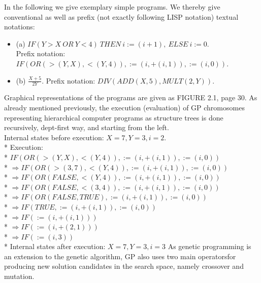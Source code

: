 \documentclass[12pt]{book}
\newcounter{subsubsubsection}[subsubsection]
\begin{document}
In the following we give exemplary simple programs. We thereby give conventional as well as prefix (not exactly following LISP notation) textual notations:
\begin{itemize}
\item (a) $IF (Y>X\ OR\ Y<4)\ THEN\ i:=(i+1),\ ELSE\ i:=0.$\\
Prefix notation: $IF(OR(>(Y,X),<(Y,4)),:=(i,+(i,1)),:=(i,0)).$
\item (b) $\frac{X+5}{2Y}.$ Prefix notation: $DIV(ADD(X,5),MULT(2,Y)).$
\end{itemize}
Graphical representations of the programs are given as FIGURE 2.1, page 30.
As already mentioned previously, the execution (evaluation) of GP chromosomes representing hierarchical computer programs as structure trees is done recursively, dept-first way, and starting from the left.\\
Internal states before execution: $X = 7, Y = 3, i = 2$.\\*
Execution:\\*
$IF(OR(>(Y,X),<(Y,4)),:=(i,+(i,1)),:=(i,0))$\\*
$\Rightarrow IF(OR(>(3,7),<(Y,4)),:=(i,+(i,1)),:=(i,0))$\\*
$\Rightarrow IF(OR(FALSE,<(Y,4)),:=(i,+(i,1)),:=(i,0))$\\*
$\Rightarrow IF(OR(FALSE,<(3,4)),:=(i,+(i,1)),:=(i,0))$\\*
$\Rightarrow IF(OR(FALSE,TRUE),:=(i,+(i,1)),:=(i,0))$\\*
$\Rightarrow IF(TRUE,:=(i,+(i,1)),:=(i,0))$\\*
$\Rightarrow IF(:=(i,+(i,1)))$\\*
$\Rightarrow IF(:=(i,+(2,1)))$\\*
$\Rightarrow IF(:=(i,3))$\\*
Internal states after execution: $X = 7, Y = 3, i = 3$
As genetic programming is an extension to the genetic algorithm, GP also uses two main operatorsfor producing new solution candidates in the search space, namely crossover and mutation.
\end{document}
